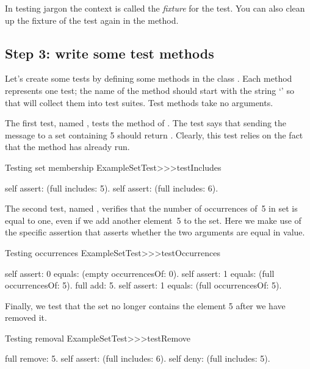 \documentclass[a4paper,10pt,twoside]{book}
\begin{document}
\noindent
In testing jargon the context is called the \emph{fixture} for the test.
You can also clean up the fixture of the test again in the  method.

\subsection{Step 3: write some test methods}

Let's create some tests by defining some methods in the class .
Each method represents one test; the name of the method should start with the string `' so that \sunit will collect them into test suites.
Test methods take no arguments.

The first test, named , tests the  method of .  The test says that sending the message  to a set containing 5 should return .
Clearly, this test relies on the fact that the  method has already run.

\begin{method}[testIncludes]{Testing set membership}
ExampleSetTest>>>testIncludes

	self assert: (full includes: 5).
	self assert: (full includes: 6).
\end{method}

The second test, named , verifies that the number of occurrences of~5 in  set is equal to one, even if we add another element~5 to the set. Here we make use of the specific assertion  that asserts whether the two arguments are equal in value.

\begin{method}[testOccurrences]{Testing occurrences}
ExampleSetTest>>>testOccurrences

	self assert: 0 equals: (empty occurrencesOf: 0).
	self assert: 1 equals: (full occurrencesOf: 5).
	full add: 5.
	self assert: 1 equals: (full occurrencesOf: 5).
\end{method}

Finally, we test that the set no longer contains the element 5 after we have removed it.

\begin{method}[testRemove]{Testing removal}
ExampleSetTest>>>testRemove

	full remove: 5.
	self assert: (full includes: 6).
	self deny: (full includes: 5).
\end{method}
\end{document}
